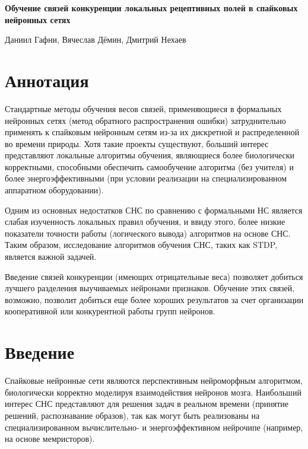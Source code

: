 \documentclass[a4paper]{article}
\begin{document}
\thispagestyle{empty}

\begin{center}
    \large\textbf{Обучение связей конкуренции локальных рецептивных полей в спайковых нейронных сетях}\\
    \hfill\break
    
    Даниил Гафни, Вячеслав Дёмин, Дмитрий Нехаев
\end{center}


\tableofcontents

\section*{Аннотация}
Стандартные методы обучения весов связей, применяющиеся в формальных нейронных сетях (метод обратного распространения ошибки) затруднительно применять к спайковым нейронным сетям из-за их дискретной и распределенной во времени природы. Хотя такие проекты существуют, больший интерес представляют локальные алгоритмы обучения, являющиеся более биологически корректными, способными обеспечить самообучение алгоритма (без учителя) и более энергоэффективными (при условии реализации на специализированном аппаратном оборудовании). 

Одним из основных недостатков СНС по сравнению с формальными НС является слабая изученность локальных правил обучения, и ввиду этого, более низкие показатели точности работы (логического вывода) алгоритмов на основе СНС. Таким образом, исследование алгоритмов обучения СНС, таких как STDP, является важной задачей. 

Введение связей конкуренции (имеющих отрицательные веса) позволяет добиться лучшего разделения выучиваемых нейронами признаков. Обучение этих связей, возможно, позволит добиться еще более хороших результатов за счет организации кооперативной или конкурентной работы групп нейронов.


\section*{Введение}
Спайковые нейронные сети являются перспективным нейроморфным алгоритмом, биологически корректно моделируя взаимодействия нейронов мозга. Наибольший интерес СНС представляют для решения задач в реальном времени (принятие решений, распознавание образов), так как могут быть реализованы на специализированном вычислительно- и энергоэффективном нейрочипе (например, на основе мемристоров).
\end{document}
